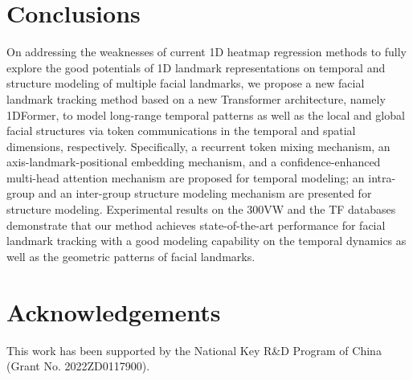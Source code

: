 \documentclass[review]{elsarticle}
\begin{document}
\section{Conclusions}
On addressing the weaknesses of current 1D heatmap regression methods to fully explore the good potentials of 1D landmark representations on temporal and structure modeling of multiple facial landmarks, we propose a new facial landmark tracking method based on a new Transformer architecture, namely 1DFormer, to model long-range temporal  patterns as well as the local and global facial structures via token communications in the temporal and spatial dimensions, respectively. Specifically, a recurrent token mixing mechanism, an axis-landmark-positional embedding mechanism, and a confidence-enhanced multi-head attention mechanism are proposed for temporal modeling; an intra-group and an inter-group structure modeling mechanism are presented for structure modeling. Experimental results on the 300VW and the TF databases demonstrate that our method achieves state-of-the-art performance for facial landmark tracking with a good modeling capability on the temporal dynamics as well as the geometric patterns of facial landmarks. 

\section*{Acknowledgements}
This work has been supported by the National Key R\&D Program of China  (Grant No. 2022ZD0117900).


\end{document}
